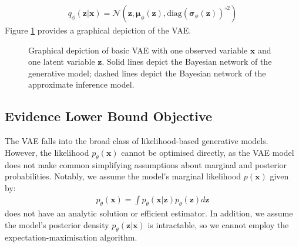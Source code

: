 \documentclass[ oneside,%
                    author={George Herbert},
                    degree={MSci},
                     title={Diffusion Models for Time-Evolving Precipitation Fields},
                  subtitle={}]{dissertation}
\begin{document}
\begin{align}
      q_\phi(\mathbf{z}|\mathbf{x})=\mathcal{N}(\mathbf{z}, \boldsymbol{\mu}_\phi(\mathbf{z}), \mathrm{diag}(\boldsymbol\sigma_\phi(\mathbf{z}))^{\circ 2})
\end{align}
Figure \ref{fig:vae} provides a graphical depiction of the VAE.
\begin{figure}[htbp]
      \centering
      \caption{Graphical depiction of basic VAE with one observed variable $\mathbf{x}$ and one latent variable $\mathbf{z}$. Solid lines depict the Bayesian network of the generative model; dashed lines depict the Bayesian network of the approximate inference model.}
      \label{fig:vae}
\end{figure}

\subsection{Evidence Lower Bound Objective}
\label{sec:background_vae_elbo}

The VAE falls into the broad class of likelihood-based generative models. However, the likelihood $p_\theta(\mathbf{x})$ cannot be optimised directly, as the VAE model does not make common simplifying assumptions about marginal and posterior probabilities. Notably, we assume the model's marginal likelihood $p(\mathbf{x})$ given by:
\begin{align}
      p_\theta(\mathbf{x}) = \int p_\theta(\mathbf{x}|\mathbf{z})p_\theta(\mathbf{z}) d\mathbf{z}
\end{align}
does not have an analytic solution or efficient estimator. In addition, we assume the model's posterior density $p_\theta(\mathbf{z}|\mathbf{x})$ is intractable, so we cannot employ the expectation-maximisation algorithm.
\end{document}
